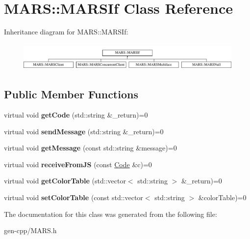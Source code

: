 \hypertarget{classMARS_1_1MARSIf}{}\section{M\+A\+RS\+:\+:M\+A\+R\+S\+If Class Reference}
\label{classMARS_1_1MARSIf}
Inheritance diagram for M\+A\+RS\+:\+:M\+A\+R\+S\+If\+:\begin{figure}[H]
\begin{center}
\leavevmode
\includegraphics[height=1.443299cm]{classMARS_1_1MARSIf}
\end{center}
\end{figure}
\subsection*{Public Member Functions}
\begin{DoxyCompactItemize}
\item 
\mbox{\label{classMARS_1_1MARSIf_ad9000319d6abe1db975c438b2988c20a}} 
virtual void {\bfseries get\+Code} (std\+::string \&\+\_\+return)=0
\item 
\mbox{\label{classMARS_1_1MARSIf_a48804756c1d66c67d7275145d9c0b723}} 
virtual void {\bfseries send\+Message} (std\+::string \&\+\_\+return)=0
\item 
\mbox{\label{classMARS_1_1MARSIf_a59082cb21aa687137f8a4e18ee4e802b}} 
virtual void {\bfseries get\+Message} (const std\+::string \&message)=0
\item 
\mbox{\label{classMARS_1_1MARSIf_a72146cab12d00c5ca1e7bd68d7548e8c}} 
virtual void {\bfseries receive\+From\+JS} (const \hyperlink{classMARS_1_1Code}{Code} \&c)=0
\item 
\mbox{\label{classMARS_1_1MARSIf_af643a67825196fc9c659ea04bd892b17}} 
virtual void {\bfseries get\+Color\+Table} (std\+::vector$<$ std\+::string $>$ \&\+\_\+return)=0
\item 
\mbox{\label{classMARS_1_1MARSIf_a3aae6af9e5828e00a2da6316728b0cbb}} 
virtual void {\bfseries set\+Color\+Table} (const std\+::vector$<$ std\+::string $>$ \&color\+Table)=0
\end{DoxyCompactItemize}


The documentation for this class was generated from the following file\+:\begin{DoxyCompactItemize}
\item 
gen-\/cpp/M\+A\+R\+S.\+h\end{DoxyCompactItemize}
